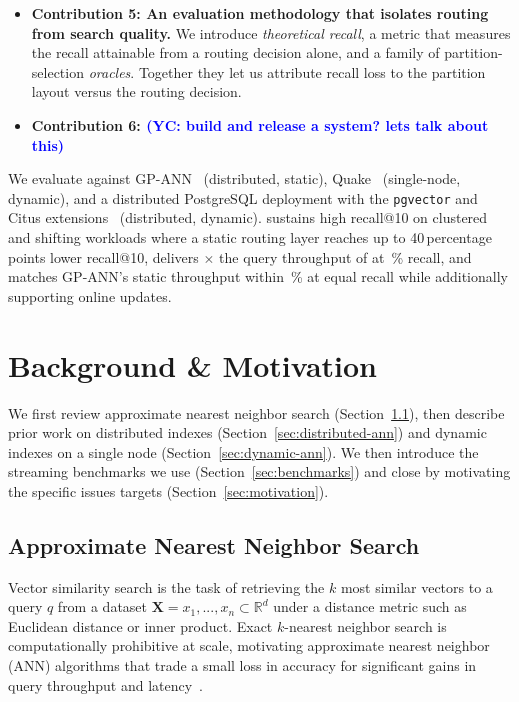 \documentclass[sigconf,review,anonymous]{acmart}
\newcommand{\yc}[1]{\textcolor{blue}{(YC: #1)}}
\begin{document}
\begin{itemize}
    \item {\bf Contribution 5: An evaluation methodology that isolates routing from search quality.} We introduce \emph{theoretical recall}, a metric that measures the recall attainable from a routing decision alone, and a family of partition-selection \emph{oracles}. Together they let us attribute recall loss to the partition layout versus the routing decision.

    
    \item {\bf Contribution 6: \yc{build and release a system? lets talk about this} }
    
    
\end{itemize}
    We evaluate \SystemName{} against GP-ANN~\cite{gottesbueren2025unleashing} (distributed, static), Quake~\cite{mohoney2025quake} (single-node, dynamic), and a distributed PostgreSQL deployment with the \texttt{pgvector} and Citus extensions~\cite{postgresql, pgvector, cubukcu2021citus} (distributed, dynamic). \SystemName{} sustains high recall@10 on clustered and shifting workloads where a static routing layer reaches up to 40\,percentage points lower recall@10, delivers $\times$ the query throughput of  at \,\% recall, and matches GP-ANN's static throughput within \,\% at equal recall while additionally supporting online updates.

\section{Background \& Motivation}
We first review approximate nearest neighbor search (Section~\ref{sec:background-ann}), then describe prior work on distributed indexes (Section~\ref{sec:distributed-ann}) and dynamic indexes on a single node (Section~\ref{sec:dynamic-ann}). We then introduce the streaming benchmarks we use (Section~\ref{sec:benchmarks}) and close by motivating the specific issues \SystemName{} targets (Section~\ref{sec:motivation}).

\subsection{Approximate Nearest Neighbor Search}
\label{sec:background-ann}
    Vector similarity search is the task of retrieving the $k$ most similar vectors to a query $q$ from a dataset $\mathbf{X} = {x_1,...,x_n} \subset \mathbb{R}^d$ under a distance metric such as Euclidean distance or inner product. Exact $k$-nearest neighbor search is computationally prohibitive at scale, motivating approximate nearest neighbor (ANN) algorithms that trade a small loss in accuracy for significant gains in query throughput and latency~\cite{malkov2018efficient, jegou2011searching, li2020annsurvey, aumuller2020ann}.
\end{document}
